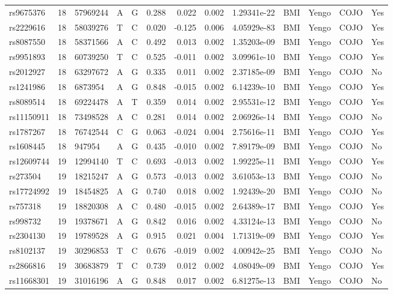 \documentclass[11pt,twoside]{bristolthesis}
\begin{document}
\begin{longtable}[t]{lrlllrrrlllll}
rs9675376 & 18 & 57969244 & A & G & 0.288 & 0.022 & 0.002 & 1.29341e-22 & BMI & Yengo & COJO & Yes\\
rs2229616 & 18 & 58039276 & T & C & 0.020 & -0.125 & 0.006 & 4.05929e-83 & BMI & Yengo & COJO & Yes\\
rs8087550 & 18 & 58371566 & A & C & 0.492 & 0.013 & 0.002 & 1.35203e-09 & BMI & Yengo & COJO & Yes\\
rs9951893 & 18 & 60739250 & T & C & 0.525 & -0.011 & 0.002 & 3.09961e-10 & BMI & Yengo & COJO & Yes\\
\addlinespace
rs2012927 & 18 & 63297672 & A & G & 0.335 & 0.011 & 0.002 & 2.37185e-09 & BMI & Yengo & COJO & No\\
rs1241986 & 18 & 6873954 & A & G & 0.848 & -0.015 & 0.002 & 6.14239e-10 & BMI & Yengo & COJO & Yes\\
rs8089514 & 18 & 69224478 & A & T & 0.359 & 0.014 & 0.002 & 2.95531e-12 & BMI & Yengo & COJO & Yes\\
rs11150911 & 18 & 73498528 & A & C & 0.281 & 0.014 & 0.002 & 2.06926e-14 & BMI & Yengo & COJO & No\\
rs1787267 & 18 & 76742544 & C & G & 0.063 & -0.024 & 0.004 & 2.75616e-11 & BMI & Yengo & COJO & Yes\\
\addlinespace
rs1608445 & 18 & 947954 & A & G & 0.435 & -0.010 & 0.002 & 7.89179e-09 & BMI & Yengo & COJO & No\\
rs12609744 & 19 & 12994140 & T & C & 0.693 & -0.013 & 0.002 & 1.99225e-11 & BMI & Yengo & COJO & Yes\\
rs273504 & 19 & 18215247 & A & G & 0.573 & -0.013 & 0.002 & 3.61053e-13 & BMI & Yengo & COJO & No\\
rs17724992 & 19 & 18454825 & A & G & 0.740 & 0.018 & 0.002 & 1.92439e-20 & BMI & Yengo & COJO & No\\
rs757318 & 19 & 18820308 & A & C & 0.480 & -0.015 & 0.002 & 2.64389e-17 & BMI & Yengo & COJO & Yes\\
\addlinespace
rs998732 & 19 & 19378671 & A & G & 0.842 & 0.016 & 0.002 & 4.33124e-13 & BMI & Yengo & COJO & No\\
rs2304130 & 19 & 19789528 & A & G & 0.915 & 0.021 & 0.004 & 1.71319e-09 & BMI & Yengo & COJO & Yes\\
rs8102137 & 19 & 30296853 & T & C & 0.676 & -0.019 & 0.002 & 4.00942e-25 & BMI & Yengo & COJO & No\\
rs2866816 & 19 & 30683879 & T & C & 0.739 & 0.012 & 0.002 & 4.08049e-09 & BMI & Yengo & COJO & Yes\\
rs11668301 & 19 & 31016196 & A & G & 0.848 & 0.017 & 0.002 & 6.81275e-13 & BMI & Yengo & COJO & No\\

\end{longtable}
\end{document}
